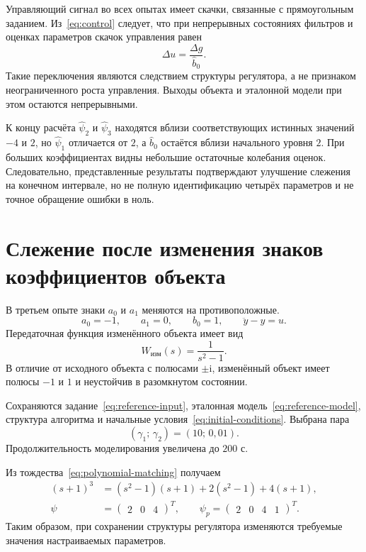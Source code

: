 Управляющий сигнал во всех опытах имеет скачки, связанные
с прямоугольным заданием. Из~\eqref{eq:control} следует,
что при непрерывных состояниях фильтров и оценках параметров
скачок управления равен
\begin{equation}
  \Delta u=\frac{\Delta g}{\hat b_0}.
  \label{eq:control-jump}
\end{equation}
Такие переключения являются следствием структуры регулятора,
а не признаком неограниченного роста управления.
Выходы объекта и эталонной модели при этом остаются непрерывными.

К концу расчёта $\hat\psi_2$ и $\hat\psi_3$ находятся
вблизи соответствующих истинных значений $-4$ и $2$,
но $\hat\psi_1$ отличается от $2$, а $\hat b_0$ остаётся
вблизи начального уровня $2$.
При больших коэффициентах видны небольшие остаточные колебания
оценок. Следовательно, представленные результаты подтверждают
улучшение слежения на конечном интервале, но не полную идентификацию
четырёх параметров и не точное обращение ошибки в ноль.


\section{Слежение после изменения знаков коэффициентов объекта}

В третьем опыте знаки $a_0$ и $a_1$ меняются на противоположные.
\begin{equation}
  a_0=-1,\qquad a_1=0,\qquad b_0=1,
  \qquad \ddot y-y=u.
  \label{eq:modified-plant}
\end{equation}
Передаточная функция изменённого объекта имеет вид
\begin{equation}
  W_{\text{изм}}(s)=\frac{1}{s^2-1}.
\end{equation}
В отличие от исходного объекта с полюсами $\pm\mathrm{i}$,
изменённый объект имеет полюсы $-1$ и $1$ и неустойчив
в разомкнутом состоянии.

Сохраняются задание~\eqref{eq:reference-input}, эталонная
модель~\eqref{eq:reference-model}, структура алгоритма
и начальные условия~\eqref{eq:initial-conditions}.
Выбрана пара
\begin{equation}
  (\gamma_1;\,\gamma_2)=(10;\,0{,}01).
\end{equation}
Продолжительность моделирования увеличена до $200$ с.

Из тождества~\eqref{eq:polynomial-matching} получаем
\begin{equation}
  \begin{aligned}
    (s+1)^3&=(s^2-1)(s+1)+2(s^2-1)+4(s+1),\\
    \psi&=\begin{pmatrix}2&0&4\end{pmatrix}^{T},
    \qquad
    \psi_p=\begin{pmatrix}2&0&4&1\end{pmatrix}^{T}.
  \end{aligned}
  \label{eq:modified-parameters}
\end{equation}
Таким образом, при сохранении структуры регулятора
изменяются требуемые значения настраиваемых параметров.

